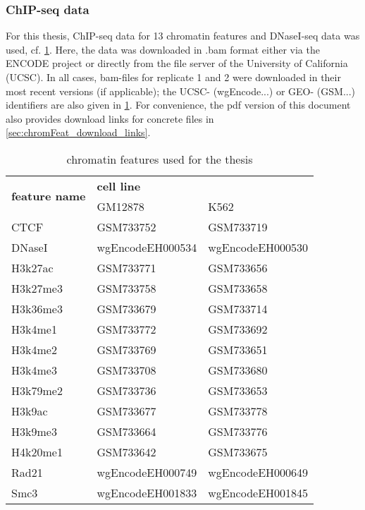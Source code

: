 \subsubsection{ChIP-seq data} \label{sec:methods:chipseq}
For this thesis, ChIP-seq data for 13 chromatin features and DNaseI-seq data was used, cf. \cref{tab:methods:csdata}.
Here, the data was downloaded in .bam format either via the ENCODE project \cite{Encode2012,Davis2017} 
or directly from the file server of the University of California (UCSC). 
In all cases, bam-files for replicate 1 and 2 were downloaded in their most recent versions (if applicable);
the UCSC- (wgEncode...) or GEO- (GSM...) identifiers are also given in \cref{tab:methods:csdata}.
For convenience, the pdf version of this document also provides download links for concrete files in \cref{sec:chromFeat_download_links}.
\begin{table}[ht!]
\centering
 \begin{tabular}{lll}
 \hline
  \multicolumn{1}{c}{\multirow{2}{*}{\textbf{feature name}}} & \multicolumn{2}{l}{\hspace*{18mm}\textbf{cell line}} \\
\multicolumn{1}{c}{}                                       & GM12878             & K562             \\ \hline
  CTCF & GSM733752 & GSM733719\\
  DNaseI & wgEncodeEH000534 & wgEncodeEH000530\\
  H3k27ac & GSM733771 & GSM733656\\
  H3k27me3 &GSM733758 & GSM733658\\
  H3k36me3 &GSM733679 & GSM733714\\
  H3k4me1  &GSM733772 & GSM733692\\
  H3k4me2  &GSM733769 & GSM733651\\
  H3k4me3 &GSM733708 & GSM733680\\
  H3k79me2 &GSM733736	& GSM733653	\\
  H3k9ac &GSM733677 & GSM733778\\
  H3k9me3 &GSM733664 & GSM733776	\\
  H4k20me1 &GSM733642 & GSM733675\\
  Rad21 &	wgEncodeEH000749 & wgEncodeEH000649\\
  Smc3 & 	wgEncodeEH001833 & wgEncodeEH001845\\ \hline
 \end{tabular}
 \caption{chromatin features used for the thesis} \label{tab:methods:csdata}
\end{table}

